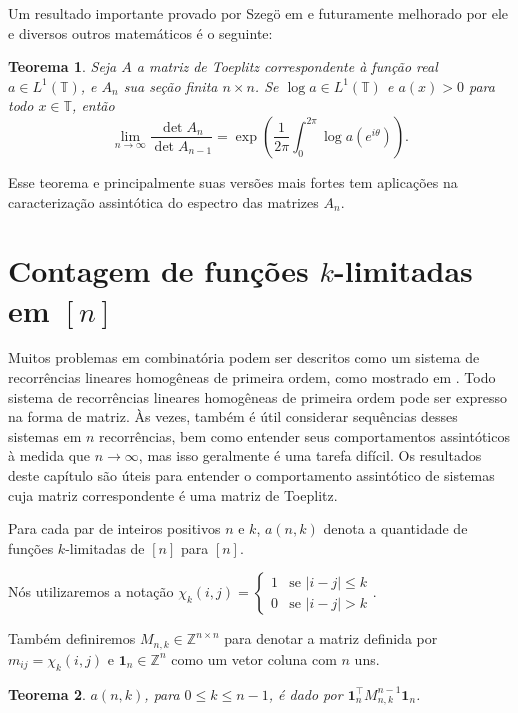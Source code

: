 \documentclass[a4paper,12pt]{article}
\newtheorem{theorem}{Teorema}
\theoremstyle{definition}
\begin{document}
Um resultado importante provado por Szegö em \cite{szego1915} e futuramente melhorado por ele e diversos outros matemáticos é o seguinte:
\begin{theorem}
  Seja $A$ a matriz de Toeplitz correspondente à função real $a \in L^1(\mathbb{T})$, e $A_n$ sua seção finita $n \times n$. Se $\log a \in L^1(\mathbb{T})$ e $a(x) > 0$ para todo $x \in \mathbb{T}$, então \[\lim_{n\to \infty} \frac{\det A_n}{\det A_{n-1}} = \exp\left(\frac{1}{2\pi} \int_{0}^{2\pi} \log a\left(e^{i\theta}\right) \right)\text{.}\]
\end{theorem}

Esse teorema e principalmente suas versões mais fortes tem aplicações na caracterização assintótica do espectro das matrizes $A_n$.



\newpage

\section{Contagem de funções \texorpdfstring{$k$}{k}-limitadas em \texorpdfstring{$[n]$}{[n]}} \vspace{1cm} Muitos problemas em combinatória podem ser descritos como um sistema de recorrências lineares homogêneas de primeira ordem, como mostrado em \cite{coulson}. Todo sistema de recorrências lineares homogêneas de primeira ordem pode ser expresso na forma de matriz. Às vezes, também é útil considerar sequências desses sistemas em $n$ recorrências, bem como entender seus comportamentos assintóticos à medida que $n \to \infty$, mas isso geralmente é uma tarefa difícil. Os resultados deste capítulo são úteis para entender o comportamento assintótico de sistemas cuja matriz correspondente é uma matriz de Toeplitz.

Para cada par de inteiros positivos $n$ e $k$, $a(n,k)$ denota a quantidade de funções $k$-limitadas de $[n]$ para $[n]$.

Nós utilizaremos a notação $\chi_k(i, j) = \begin{cases} 1 & \text{se } \lvert i - j\rvert \le k \\ 0 & \text{se } \lvert i - j\rvert > k \end{cases}$.

Também definiremos $M_{n,k} \in \mathbb{Z}^{n \times n}$ para denotar a matriz definida por $m_{ij} = \chi_k(i, j)$ e $\mathbf{1}_n \in \mathbb{Z}^n$ como um vetor coluna com $n$ uns.

\begin{theorem} \label{th:matrix-form-n-to-n} $a(n,k)$, para $0 \le k \le n - 1$, é dado por $\mathbf{1}_n^\intercal M_{n,k}^{n-1} \mathbf{1}_n$. \end{theorem}
\end{document}
